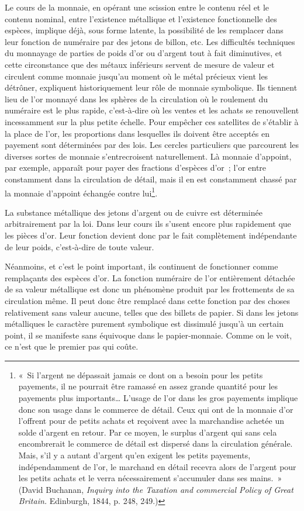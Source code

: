 \documentclass[french,twoside]{book} %
\begin{document}
Le cours de la monnaie, en opérant une scission entre le contenu réel et le contenu nominal, entre l’existence métallique et l’existence fonctionnelle des espèces, implique déjà, sous forme latente, la possibilité de les remplacer dans leur fonction de numéraire par des jetons de billon, etc. Les difficultés techniques du monnayage de parties de poids d’or ou d’argent tout à fait diminutives, et cette circonstance que des métaux inférieurs servent de mesure de valeur et circulent comme monnaie jusqu’au moment où le métal précieux vient les détrôner, expliquent historiquement leur rôle de monnaie symbolique. Ils tiennent lieu de l’or monnayé dans les sphères de la circulation où le roulement du numéraire est le plus rapide, c’est‑à‑dire où les ventes et les achats se renouvellent incessamment sur la plus petite échelle. Pour empêcher ces satellites de s’établir à la place de l’or, les proportions dans lesquelles ils doivent être acceptés en payement sont déterminées par des lois. Les cercles particuliers que parcourent les diverses sortes de monnaie s’entrecroisent naturellement. Là monnaie d’appoint, par exemple, apparaît pour payer des fractions d’espèces d’or ; l’or entre constamment dans la circulation de détail, mais il en est constamment chassé par la monnaie d’appoint échangée contre lui\footnote{« Si l’argent ne dépassait jamais ce dont on a besoin pour les petits payements, il ne pourrait être ramassé en assez grande quantité pour les payements plus importants… L’usage de l’or dans les gros payements implique donc son usage dans le commerce de détail. Ceux qui ont de la monnaie d’or l’offrent pour de petits achats et reçoivent avec la marchandise achetée un solde d’argent en retour. Par ce moyen, le surplus d’argent qui sans cela encombrerait le commerce de détail est dispersé dans la circulation générale. Mais, s’il y a autant d’argent qu’en exigent les petits payements, indépendamment de l’or, le marchand en détail recevra alors de l’argent pour les petits achats et le verra nécessairement s’accumuler dans ses mains. » (David Buchanan, \emph{Inquiry into the Taxation and commercial Policy of Great Britain.} Edinburgh, 1844, p. 248, 249.)}.\par
La substance métallique des jetons d’argent ou de cuivre est déterminée arbitrairement par la loi. Dans leur cours ils s’usent encore plus rapidement que les pièces d’or. Leur fonction devient donc par le fait complètement indépendante de leur poids, c’est‑à-dire de toute valeur.\par
Néanmoins, et c’est le point important, ils continuent de fonctionner comme remplaçants des espèces d’or. La fonction numéraire de l’or entièrement détachée de sa valeur métallique est donc un phénomène produit par les frottements de sa circulation même. Il peut donc être remplacé dans cette fonction par des choses relativement sans valeur aucune, telles que des billets de papier. Si dans les jetons métalliques le caractère purement symbolique est dissimulé jusqu’à un certain point, il se manifeste sans équivoque dans le papier‑monnaie. Comme on le voit, ce n’est que le premier pas qui coûte.\par
\end{document}
